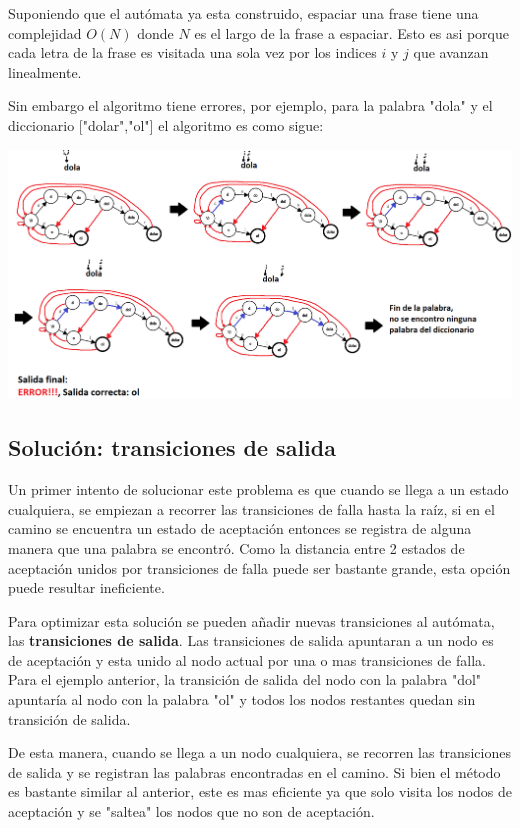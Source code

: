 \documentclass{article}
\begin{document}
Suponiendo que el autómata ya esta construido, espaciar una frase tiene una complejidad $O(N)$ donde $N$ es el largo de la frase a espaciar.
Esto es asi porque cada letra de la frase es visitada una sola vez por los indices $i$ y $j$ que avanzan linealmente.

\newpage

Sin embargo el algoritmo tiene errores, por ejemplo, para la palabra "dola" y el diccionario ["dolar","ol"] el algoritmo es como sigue:

\begin{center}
    \includegraphics[scale=0.3]{Imagenes/automata_falla_ejemplo_dola.png}
\end{center}

\subsection*{Solución: transiciones de salida}

Un primer intento de solucionar este problema es que cuando se llega a un estado cualquiera, se empiezan a recorrer las transiciones de falla
hasta la raíz, si en el camino se encuentra un estado de aceptación entonces se registra de alguna manera que una palabra se encontró.
Como la distancia entre 2 estados de aceptación unidos por transiciones de falla puede ser bastante grande, esta opción puede resultar ineficiente.

Para optimizar esta solución se pueden añadir nuevas transiciones al autómata, las \textbf{transiciones de salida}. Las transiciones de salida apuntaran a un nodo es de aceptación
y esta unido al nodo actual por una o mas transiciones de falla. Para el ejemplo anterior, la transición de salida del nodo con la palabra "dol" apuntaría al nodo con la palabra "ol" y
todos los nodos restantes quedan sin transición de salida.

De esta manera, cuando se llega a un nodo cualquiera, se recorren las transiciones de salida y se registran las palabras encontradas en el camino. Si bien el método es bastante similar al anterior, este
es mas eficiente ya que solo visita los nodos de aceptación y se "saltea" los nodos que no son de aceptación.
\end{document}
